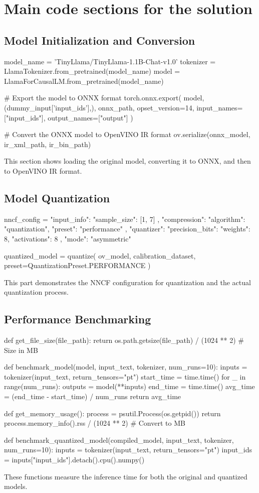 \documentclass{josis}
\begin{document}
\section{Main code sections for the solution}
\subsection{Model Initialization and Conversion}
\begin{python}
model_name = 'TinyLlama/TinyLlama-1.1B-Chat-v1.0'
tokenizer = LlamaTokenizer.from_pretrained(model_name)
model = LlamaForCausalLM.from_pretrained(model_name)

# Export the model to ONNX format
torch.onnx.export(
    model,
    (dummy_input['input_ids'],),
    onnx_path,
    opset_version=14,
    input_names=["input_ids"],
    output_names=["output"]
)

# Convert the ONNX model to OpenVINO IR format
ov.serialize(onnx_model, ir_xml_path, ir_bin_path)
\end{python}
This section shows loading the original model, converting it to ONNX, and then to OpenVINO IR format.

\subsection{Model Quantization}
\begin{python}
nncf_config = {
    "input_info": {
        "sample_size": [1, 7]
    },
    "compression": {
        "algorithm": "quantization",
        "preset": "performance"
    },
    "quantizer": {
        "precision_bits": {
            "weights": 8,
            "activations": 8
        },
        "mode": "asymmetric"
    }
}

quantized_model = quantize(
    ov_model,
    calibration_dataset,
    preset=QuantizationPreset.PERFORMANCE
)

\end{python}
This part demonstrates the NNCF configuration for quantization and the actual quantization process.
\subsection{Performance Benchmarking}
\begin{python}
def get_file_size(file_path):
    return os.path.getsize(file_path) / (1024 ** 2)  # Size in MB

def benchmark_model(model, input_text, tokenizer, num_runs=10):
    inputs = tokenizer(input_text, return_tensors="pt")
    start_time = time.time()
    for _ in range(num_runs):
        outputs = model(**inputs)
    end_time = time.time()
    avg_time = (end_time - start_time) / num_runs
    return avg_time

def get_memory_usage():
    process = psutil.Process(os.getpid())
    return process.memory_info().rss / (1024 ** 2)  # Convert to MB

def benchmark_quantized_model(compiled_model, input_text, tokenizer, num_runs=10):
    inputs = tokenizer(input_text, return_tensors="pt")
    input_ids = inputs["input_ids"].detach().cpu().numpy()
\end{python}
These functions measure the inference time for both the original and quantized models.
\end{document}
